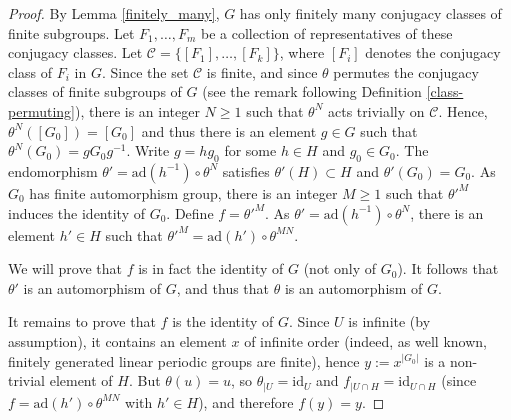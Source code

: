 \documentclass[10pt,a4paper]{amsart}
\renewcommand{\geq}{\geqslant}
\begin{document}
\begin{proof}
By Lemma \ref{finitely_many}, $G$ has only finitely many conjugacy classes of finite subgroups. Let $F_1,\ldots,F_m$ be a collection of representatives of these conjugacy classes. Let $\mathcal{C}=\lbrace [F_1],\ldots,[F_k]\rbrace$, where $[F_i]$ denotes the conjugacy class of $F_i$ in $G$. Since the set $\mathcal{C}$ is finite, and since $\theta$ permutes the conjugacy classes of finite subgroups of $G$ (see the remark following Definition \ref{class-permuting}), there is an integer $N\geq 1$ such that $\theta^N$ acts trivially on $\mathcal{C}$. Hence, $\theta^N([G_0])=[G_0]$ and thus there is an element $g\in G$ such that $\theta^N(G_0)=gG_0g^{-1}$. Write $g=hg_0$ for some $h\in H$ and $g_0\in G_0$. The endomorphism $\theta'=\mathrm{ad}(h^{-1})\circ \theta^N$ satisfies $\theta'(H)\subset H$ and $\theta'(G_0)=G_0$. As $G_0$ has finite automorphism group, there is an integer $M\geq 1$ such that $\theta'^M$ induces the identity of $G_0$. Define $f=\theta'^M$. As $\theta'=\mathrm{ad}(h^{-1})\circ \theta^N$, there is an element $h'\in H$ such that $\theta'^M=\mathrm{ad}(h')\circ \theta^{MN}$.

\smallskip \noindent
We will prove that $f$ is in fact the identity of $G$ (not only of $G_0$). It follows that $\theta'$ is an automorphism of $G$, and thus that $\theta$ is an automorphism of $G$.


\smallskip \noindent
It remains to prove that $f$ is the identity of $G$. Since $U$ is infinite (by assumption), it contains an element $x$ of infinite order (indeed, as well known, finitely generated linear periodic groups are finite), hence $y:=x^{\vert G_0\vert}$ is a non-trivial element of $H$. But $\theta(u)=u$, so $\theta_{\vert U}=\mathrm{id}_{ U}$ and $f_{\vert U\cap H}=\mathrm{id}_{U\cap H}$ (since $f=\mathrm{ad}(h')\circ \theta^{MN}$ with $h'\in H$), and therefore $f(y)=y$.


\end{proof}
\end{document}
